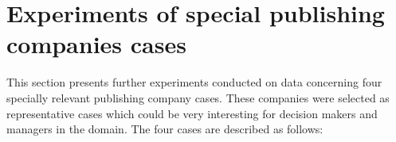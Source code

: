 \documentclass[a4paper,10pt,twocolumn,preprint,3p]{elsarticle}
\begin{document}
\section{Experiments of special publishing companies cases}
\label{sec:example_cases}

This section presents further experiments conducted on data concerning four 
specially relevant publishing company cases. These companies were 
selected as representative cases which could be very interesting for decision 
makers and managers in the domain. The four cases are described as follows:

\begin{table}
\caption{Description of publishing companies considered as special cases.}
\centering{}%
\label{Table:special_cases}
\end{table}
\end{document}
